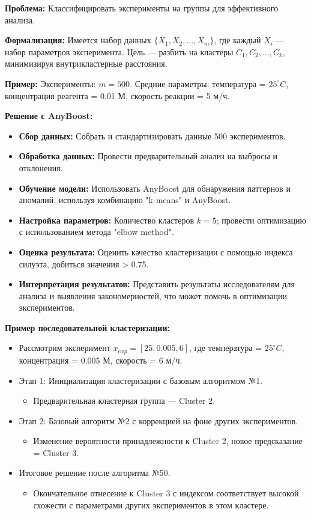\textbf{Проблема:} Классифицировать эксперименты на группы для эффективного анализа.

\textbf{Формализация:}
Имеется набор данных $\{X_1, X_2, \ldots, X_m\}$, где каждый $X_i$ — набор параметров эксперимента. Цель — разбить на кластеры $C_1, C_2, \ldots, C_k$, минимизируя внутрикластерные расстояния.

\textbf{Пример:}
Эксперименты: $m = 500$. Средние параметры: температура = $25^\circ C$, концентрация реагента = 0.01 М, скорость реакции = 5 м/ч.

\textbf{Решение с AnyBoost:}
\begin{itemize}
    \item \textbf{Сбор данных:} Собрать и стандартизировать данные 500 экспериментов.
    \item \textbf{Обработка данных:} Провести предварительный анализ на выбросы и отклонения.
    \item \textbf{Обучение модели:} Использовать AnyBoost для обнаружения паттернов и аномалий, используя комбинацию "k-means" и AnyBoost.
    \item \textbf{Настройка параметров:} Количество кластеров $k = 5$; провести оптимизацию с использованием метода "elbow method".
    \item \textbf{Оценка результата:} Оценить качество кластеризации с помощью индекса силуэта, добиться значения > 0.75.
    \item \textbf{Интерпретация результатов:} Представить результаты исследователям для анализа и выявления закономерностей, что может помочь в оптимизации экспериментов.
\end{itemize}
\textbf{Пример последовательной кластеризации:}
\begin{itemize}
    \item Рассмотрим эксперимент $x_{exp} = [25, 0.005, 6]$, где температура = $25^\circ C$, концентрация = 0.005 М, скорость = 6 м/ч.
    \item Этап 1: Инициализация кластеризации с базовым алгоритмом №1.
          \begin{itemize}
              \item Предварительная кластерная группа — Cluster 2.
          \end{itemize}
    \item Этап 2: Базовый алгоритм №2 с коррекцией на фоне других экспериментов.
          \begin{itemize}
              \item Изменение вероятности принадлежности к Cluster 2, новое предсказание = Cluster 3.
          \end{itemize}
    \item Итоговое решение после алгоритма №50.
          \begin{itemize}
              \item Окончательное отнесение к Cluster 3 с индексом соответствует высокой схожести с параметрами других экспериментов в этом кластере.
          \end{itemize}
\end{itemize}


